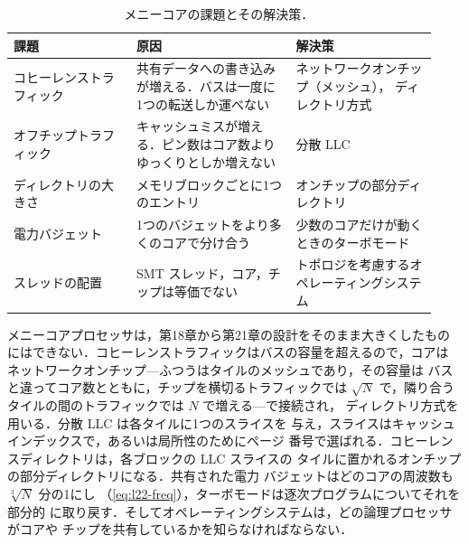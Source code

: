 \documentclass[../main.tex]{subfiles}
\begin{document}
\begin{table}[htbp]
  \centering\small
  \caption{メニーコアの課題とその解決策．}
  \label{tab:l22-challenges}
  \begin{tabular}{@{}>{\raggedright\arraybackslash}p{0.27\linewidth}>{\raggedright\arraybackslash}p{0.35\linewidth}>{\raggedright\arraybackslash}p{0.31\linewidth}@{}}
    \toprule
    課題 & 原因 & 解決策 \\
    \midrule
    コヒーレンストラフィック & 共有データへの書き込みが増える．バスは一度に
      1つの転送しか運べない & ネットワークオンチップ（メッシュ），
      ディレクトリ方式 \\
    オフチップトラフィック & キャッシュミスが増える．ピン数はコア数より
      ゆっくりとしか増えない & 分散 LLC \\
    ディレクトリの大きさ & メモリブロックごとに1つのエントリ &
      オンチップの部分ディレクトリ \\
    電力バジェット & 1つのバジェットをより多くのコアで分け合う &
      少数のコアだけが動くときのターボモード \\
    スレッドの配置 & SMT スレッド，コア，チップは等価でない &
      トポロジを考慮するオペレーティングシステム \\
    \bottomrule
  \end{tabular}
\end{table}

\begin{keypoint}[章のまとめ]
  メニーコアプロセッサは，第18章から第21章の設計をそのまま大きくしたもの
  にはできない．コヒーレンストラフィックはバスの容量を超えるので，コアは
  ネットワークオンチップ---ふつうはタイルのメッシュであり，その容量は
  バスと違ってコア数とともに，チップを横切るトラフィックでは $\sqrt{N}$
  で，隣り合うタイルの間のトラフィックでは $N$ で増える---で接続され，
  ディレクトリ方式を用いる．分散 LLC は各タイルに1つのスライスを
  与え，スライスはキャッシュインデックスで，あるいは局所性のためにページ
  番号で選ばれる．コヒーレンスディレクトリは，各ブロックの LLC スライスの
  タイルに置かれるオンチップの部分ディレクトリになる．共有された電力
  バジェットはどのコアの周波数も $\sqrt[3]{N}$ 分の1にし
  （\cref{eq:l22-freq}），ターボモードは逐次プログラムについてそれを部分的
  に取り戻す．そしてオペレーティングシステムは，どの論理プロセッサがコアや
  チップを共有しているかを知らなければならない．
\end{keypoint}
\end{document}
